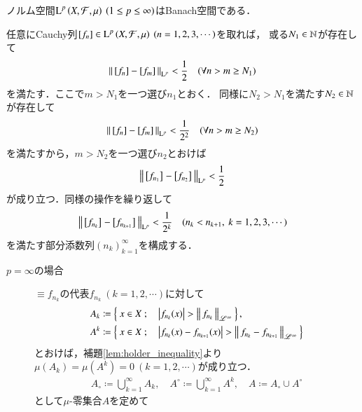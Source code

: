 \begin{screen}
	\begin{thm}
		ノルム空間$\operatorname{L}^{p} \left(X,\mathcal{F},\mu\right)\ (1 \leq p \leq \infty)$はBanach空間である．
		\label{prp:Lp_banach}
	\end{thm}
\end{screen}

\begin{prf}
	任意にCauchy列$[f_n] \in \operatorname{L}^{p} \left(X,\mathcal{F},\mu\right)\ (n=1,2,3,\cdots)$を取れば，
	或る$N_1 \in \mathbb{N}$が存在して
	\begin{align}
		\left\|\, [f_n]-[f_m]\, \right\|_{\mathrm{L}^p} < \frac{1}{2}
		\quad (\forall n > m \geq N_1)
	\end{align}
	を満たす．ここで$m > N_1$を一つ選び$n_1$とおく．
	同様に$N_2 > N_1$を満たす$N_2 \in \mathbb{N}$が存在して
	\begin{align}
		\left\|\, [f_n]-[f_m]\, \right\|_{\mathrm{L}^p} < \frac{1}{2^2}
		\quad (\forall n > m \geq N_2)
	\end{align}
	を満たすから，$m > N_2$を一つ選び$n_2$とおけば
	\begin{align}
		\left\|\, \left[f_{n_1}\right]_{} - \left[f_{n_2}\right]_{}\, \right\|_{\mathrm{L}^p} < \frac{1}{2}
	\end{align}
	が成り立つ．同様の操作を繰り返して
	\begin{align}
		\left\|\, \left[f_{n_k}\right]_{} - \left[f_{n_{k+1}}\right]_{}\, \right\|_{\mathrm{L}^p} < \frac{1}{2^k} 
		\quad (n_k < n_{k+1},\ k=1,2,3,\cdots) \label{ineq:Lp_banach_2}
	\end{align}
	を満たす部分添数列$(n_k)_{k=1}^{\infty}$を構成する．
	\begin{description}
		\item[$p = \infty$の場合]
			$\equiv{f_{n_k}}{}$の代表$f_{n_k}\ (k=1,2,\cdots)$に対して
			\begin{align}
				A_k &\coloneqq \left\{\ x \in X\ ;\quad \left| f_{n_k}(x) \right| > \left\|\, f_{n_k}\, \right\|_{\mathscr{L}^\infty}\ \right\}, \\
				A^k &\coloneqq \left\{\ x \in X\ ;\quad \left| f_{n_k}(x) - f_{n_{k+1}}(x) \right| > \left\|\, f_{n_k} - f_{n_{k+1}}\, \right\|_{\mathscr{L}^\infty}\ \right\}
			\end{align}
			とおけば，補題\ref{lem:holder_inequality}より$\mu(A_k) = \mu(A^k) = 0\ (k=1,2,\cdots)$が成り立つ．
			\begin{align}
				A_\circ \coloneqq \bigcup_{k=1}^{\infty} A_k,
				\quad A^\circ \coloneqq \bigcup_{k=1}^{\infty}A^k,
				\quad A \coloneqq A_\circ \cup A^\circ
			\end{align}
			として$\mu$-零集合$A$を定めて
			\begin{align}

\end{align}
\end{description}
\end{prf}
